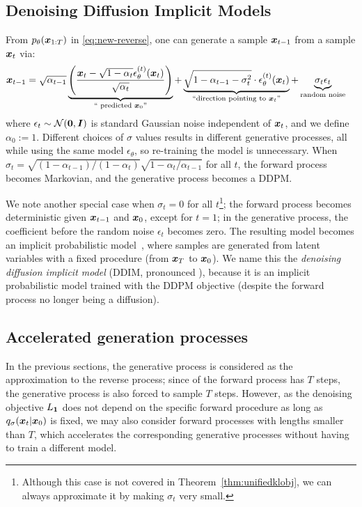 \subsection{Denoising Diffusion Implicit Models}
\label{sec:reverse-family}
From $p_\theta({\bm{x}}_{1:T})$ in \eqref{eq:new-reverse}, one can generate a sample ${\bm{x}}_{t-1}$ from a sample ${\bm{x}}_{t}$ via:
\begin{align}
    {\bm{x}}_{t-1} & = \sqrt{\alpha_{t-1}} \underbrace{\left(\frac{{\bm{x}}_t - \sqrt{1 - \alpha_t} \epsilon_\theta^{(t)}({\bm{x}}_t)}{\sqrt{\alpha_t}}\right)}_{\text{`` predicted } {\bm{x}}_0 \text{''}} + \underbrace{\sqrt{1 - \alpha_{t-1} - \sigma_t^2} \cdot \epsilon_\theta^{(t)}({\bm{x}}_t)}_{\text{``direction pointing to } {\bm{x}}_t \text{''}} + \underbrace{\sigma_t \epsilon_t}_{\text{random noise}} \label{eq:sample-eq-gen}
\end{align}
where $\epsilon_t \sim {\mathcal{N}}({\bm{0}}, {\bm{I}})$ is standard Gaussian noise independent of ${\bm{x}}_t$, and we define $\alpha_0 := 1$. Different choices of $\sigma$ values results in different generative processes, all while using the same model $\epsilon_\theta$, so re-training the model is unnecessary. When $\sigma_t = \sqrt{(1 - \alpha_{t-1}) / (1 - \alpha_t)} \sqrt{1 - \alpha_t / \alpha_{t-1}}$ for all $t$, the forward process becomes Markovian, and the generative process becomes a DDPM.

We note another special case when $\sigma_t = 0$ for all $t$\footnote{Although this case is not covered in Theorem~\ref{thm:unifiedklobj}, we can always approximate it by making $\sigma_t$ very small.}; the forward process becomes deterministic given ${\bm{x}}_{t-1}$ and ${\bm{x}}_0$, except for $t = 1$; in the generative process, the coefficient before the random noise $\epsilon_t$ becomes zero. %
    The resulting model becomes an implicit probabilistic model~\citep{mohamed2016learning}, where samples are generated from latent variables with a fixed procedure (from ${\bm{x}}_T$ to ${\bm{x}}_0$). We name this the \textit{denoising diffusion implicit model} (DDIM, pronounced ), because it is an implicit probabilistic model trained with the DDPM objective (despite the forward process no longer being a diffusion). 





\subsection{Accelerated generation processes}
\label{sec:acceleration}
In the previous sections, the generative process is considered as the approximation to the reverse process; since of the forward process has $T$ steps, the generative process is also forced to sample $T$ steps. However, as the denoising objective $L_{\bm{1}}$ does not depend on the specific forward procedure as long as $q_\sigma({\bm{x}}_{t} | {\bm{x}}_0)$ is fixed, we may also consider forward processes with lengths smaller than $T$, which accelerates the corresponding generative processes without having to train a different model.


